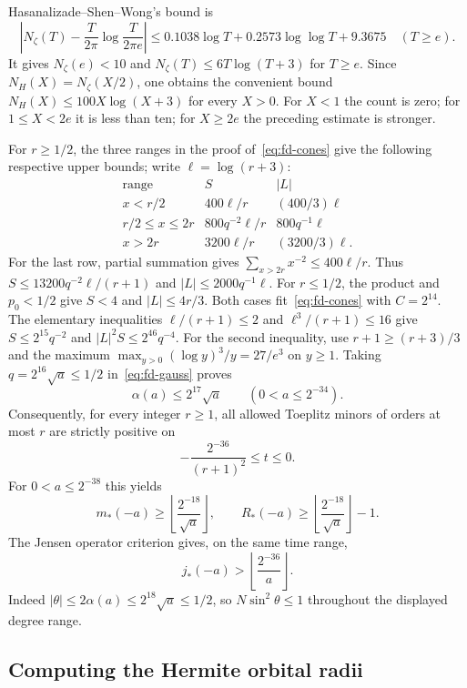Hasanalizade--Shen--Wong's bound
\cite[Corollary~1.2, (1.5), p.~2]{HSW2021} is
\[
 \left|N_\zeta(T)-\frac{T}{2\pi}\log\frac{T}{2\pi e}\right|
 \le0.1038\log T+0.2573\log\log T+9.3675\quad(T\ge e).
\]
It gives $N_\zeta(e)<10$ and $N_\zeta(T)\le6T\log(T+3)$
for $T\ge e$.  Since $N_H(X)=N_\zeta(X/2)$, one obtains the
convenient bound $N_H(X)\le100X\log(X+3)$ for every $X>0$.
For $X<1$ the count is zero; for $1\le X<2e$ it is less than ten;
for $X\ge2e$ the preceding estimate is stronger.

For $r\ge1/2$, the three ranges in the proof of~\eqref{eq:fd-cones}
give the following respective upper bounds; write $\ell=\log(r+3)$:
\[
\begin{array}{c|cc}
 \text{range}&S&|L|\\ \hline
 x<r/2&400\ell/r&(400/3)\ell\\
 r/2\le x\le2r&800q^{-2}\ell/r&800q^{-1}\ell\\
 x>2r&3200\ell/r&(3200/3)\ell.
\end{array}
\]
For the last row, partial summation gives
$\sum_{x>2r}x^{-2}\le400\ell/r$.
Thus $S\le13200q^{-2}\ell/(r+1)$ and
$|L|\le2000q^{-1}\ell$.
For $r\le1/2$, the product and $p_0<1/2$ give
$S<4$ and $|L|\le4r/3$.
Both cases fit~\eqref{eq:fd-cones} with $C=2^{14}$.
The elementary inequalities
$\ell/(r+1)\le2$ and $\ell^3/(r+1)\le16$ give
$S\le2^{15}q^{-2}$ and $|L|^2S\le2^{46}q^{-4}$.
For the second inequality, use $r+1\ge(r+3)/3$ and the maximum
$\max_{y>0}(\log y)^3/y=27/e^3$ on $y\ge1$.
Taking $q=2^{16}\sqrt a\le1/2$ in~\eqref{eq:fd-gauss} proves
\[
 \alpha(a)\le2^{17}\sqrt a\qquad(0<a\le2^{-34}).
\]
Consequently, for every integer $r\ge1$, all allowed Toeplitz minors
of orders at most $r$ are strictly positive on
\[
 -\frac{2^{-36}}{(r+1)^2}\le t\le0.
\]
For $0<a\le2^{-38}$ this yields
\[
 m_*(-a)\ge\left\lfloor\frac{2^{-18}}{\sqrt a}\right\rfloor,
 \qquad
 R_*(-a)\ge\left\lfloor\frac{2^{-18}}{\sqrt a}\right\rfloor-1.
\]
The Jensen operator criterion gives, on the same time range,
\[
 j_*(-a)>\left\lfloor\frac{2^{-36}}a\right\rfloor.
\]
Indeed $|\theta|\le2\alpha(a)\le2^{18}\sqrt a\le1/2$,
so $N\sin^2\theta\le1$ throughout the displayed degree range.

\subsection{Computing the Hermite orbital radii}

